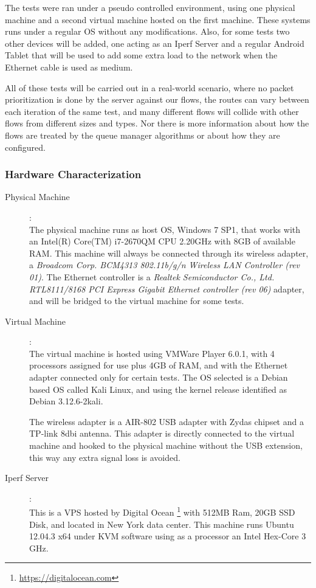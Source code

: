 The tests were ran under a pseudo controlled environment, using one
physical  machine and a second virtual machine hosted on the first machine. These
systems runs under a regular OS without any modifications. Also, for some tests two other devices will be
added,  one acting as an Iperf Server and a regular Android Tablet that will
be used to add some extra load to the network when the Ethernet cable is used
as medium.

All of these tests will be carried out in a real-world scenario, where no
packet  prioritization is done by the server against our flows, the routes can
vary between each iteration of the same test, and many different flows will
collide with other flows from different sizes and types. Nor there is more
information about how the flows are treated by the queue manager algorithms or
about how they are  configured.

\subsubsection{Hardware Characterization}

\begin{description}

\item [Physical Machine]: \hfill \\
The physical machine runs as host OS, Windows 7 SP1, that works with an Intel(R)
Core(TM) i7-2670QM CPU \@ 2.20GHz with 8GB of available RAM. This machine will 
always be connected through its wireless adapter, a \textit{Broadcom Corp. 
BCM4313 802.11b/g/n Wireless LAN Controller (rev 01)}. The Ethernet controller 
is a \textit{Realtek Semiconductor Co., Ltd. RTL8111/8168 PCI Express Gigabit 
Ethernet controller (rev 06)} adapter, and will be bridged to the virtual 
machine for some tests.

\item[Virtual Machine]: \hfill \\
The virtual machine is hosted using VMWare Player 6.0.1, with 4 processors 
assigned for use plus 4GB of RAM, and with the Ethernet adapter connected only
for certain tests. The OS selected is a Debian based OS called Kali Linux, and
using the kernel release identified as Debian 3.12.6-2kali.

The wireless adapter is a AIR-802 USB adapter with Zydas chipset and a TP-link
8dbi antenna. This adapter is directly connected to the virtual machine and
hooked to the physical machine without the USB extension, this way any extra
signal  loss is avoided. 

\item[Iperf Server]: \hfill \\ 
This is a VPS hosted by Digital Ocean
\footnote{\url{https://digitalocean.com}} with 512MB Ram, 20GB SSD Disk, and
located in New York data center. This machine runs Ubuntu 12.04.3 x64 under
KVM software using as a processor an Intel Hex-Core 3 GHz.

\end{description}


